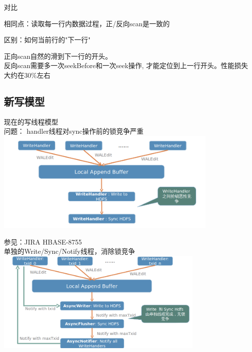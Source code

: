 \documentclass[xcolor=table]{beamer}
\begin{document}
\begin{CJK}{UTF8}{gkai}
\begin{frame}{对比}

相同点：读取每一行内数据过程，正/反向scan是一致的 \\

\bigskip

区别：如何当前行的"下一行"

正向scan自然的滑到下一行的开头。\\
反向scan需要多一次seekBefore和一次seek操作, 才能定位到上一行开头。性能损失大约在30\%左右

\end{frame}

\subsection{新写模型}
\begin{frame}{\subsecname}
	现在的写线程模型 \\
	问题： handler线程对sync操作前的锁竞争严重 \\
	\bigskip
	\includegraphics[width=\textwidth, height=5cm]{old-write-model.png}
\end{frame}

\begin{frame}{\subsecname}
	参见：JIRA HBASE-8755 \\
	单独的Write/Sync/Notify线程，消除锁竞争 \\
	\bigskip
	\includegraphics[width=\textwidth, height=5cm]{new-write-model.png}
\end{frame}


\end{CJK}
\end{document}
